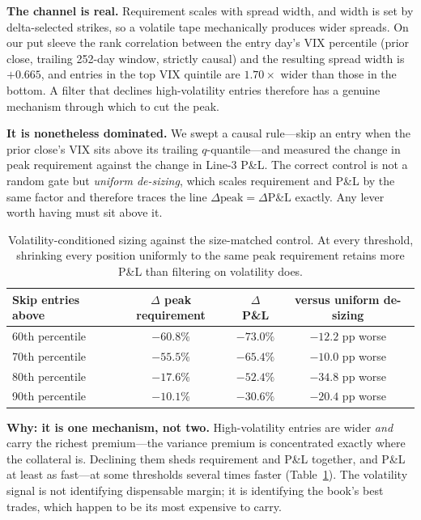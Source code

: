 \documentclass[11pt]{article}
\begin{document}
\textbf{The channel is real.} Requirement scales with spread width, and width is set by
delta-selected strikes, so a volatile tape mechanically produces wider spreads. On our put
sleeve the rank correlation between the entry day's VIX percentile (prior close, trailing
252-day window, strictly causal) and the resulting spread width is $+0.665$, and entries in the
top VIX quintile are $1.70\times$ wider than those in the bottom. A filter that declines
high-volatility entries therefore has a genuine mechanism through which to cut the peak.

\textbf{It is nonetheless dominated.} We swept a causal rule---skip an entry when the prior
close's VIX sits above its trailing $q$-quantile---and measured the change in peak requirement
against the change in Line-3 P\&L. The correct control is not a random gate but \emph{uniform
de-sizing}, which scales requirement and P\&L by the same factor and therefore traces the line
$\Delta\text{peak} = \Delta\text{P\&L}$ exactly. Any lever worth having must sit above it.

\begin{table}[h]\centering\small
\begin{tabular}{lccc}\toprule
Skip entries above & $\Delta$ peak requirement & $\Delta$ P\&L & versus uniform de-sizing \\ \midrule
60th percentile & $-60.8\%$ & $-73.0\%$ & $-12.2$ pp worse \\
70th percentile & $-55.5\%$ & $-65.4\%$ & $-10.0$ pp worse \\
80th percentile & $-17.6\%$ & $-52.4\%$ & $-34.8$ pp worse \\
90th percentile & $-10.1\%$ & $-30.6\%$ & $-20.4$ pp worse \\
\bottomrule\end{tabular}
\caption{Volatility-conditioned sizing against the size-matched control. At every threshold,
shrinking every position uniformly to the same peak requirement retains more P\&L than
filtering on volatility does.}
\label{tab:vix}\end{table}

\textbf{Why: it is one mechanism, not two.} High-volatility entries are wider \emph{and} carry
the richest premium---the variance premium is concentrated exactly where the collateral is.
Declining them sheds requirement and P\&L together, and P\&L at least as fast---at some
thresholds several times faster (Table~\ref{tab:vix}). The
volatility signal is not identifying dispensable margin; it is identifying the book's best
trades, which happen to be its most expensive to carry.
\end{document}
